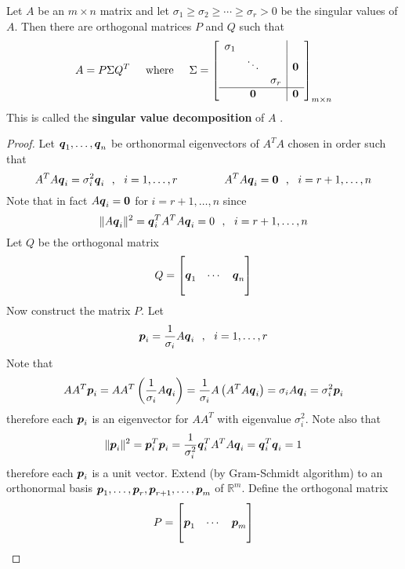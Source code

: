 \begin{theorem}
Let $A$ be an $m \times n$ matrix and let $\sigma_1 \geq \sigma_2 \geq \cdots \geq \sigma_r > 0$ be the singular values of $A$. Then there are orthogonal matrices $P$ and $Q$ such that
$$
A = P \Sigma Q^T
\hspace{5mm}
\text{where}
\hspace{5mm}
\Sigma =
\left[
\begin{array}{ccc|c}
\sigma_1 & & & \\
& \ddots & & \boldsymbol{0} \\
& & \sigma_r & \\ \hline
& \boldsymbol{0} & & \boldsymbol{0}
\end{array} \right]_{m \times n}
$$
This is called the {\bf singular value decomposition} of $A$ \cite[p.449]{KN}.

\begin{proof}
Let $\boldsymbol{q}_1,\dots,\boldsymbol{q}_n$ be orthonormal eigenvectors of $A^TA$ chosen in order such that
$$
A^TA \bs{q}_i = \sigma_i^2 \bs{q}_i \ \ , \ \ i =1,\dots,r
\hspace{15mm}
A^TA \bs{q}_i = \bs{0} \ \ , \ \ i =r+1,\dots,n
$$
Note that in fact $A\boldsymbol{q}_i = \boldsymbol{0}$ for $i=r+1,\dots,n$ since
$$
\| A\boldsymbol{q}_i \|^2 = \boldsymbol{q}_i^T A^T A\boldsymbol{q}_i = 0 \ \ , \ \ i=r+1,\dots,n
$$
Let $Q$ be the orthogonal matrix
$$
Q = \begin{bmatrix} & & \\ \boldsymbol{q}_1 & \cdots & \boldsymbol{q}_n \\ & & \end{bmatrix}
$$
Now construct the matrix $P$. Let
$$
\boldsymbol{p}_i = \frac{1}{\sigma_i} A \boldsymbol{q}_i \ \ , \ \ i = 1,\dots,r
$$
Note that
$$
AA^T \boldsymbol{p}_i =  AA^T \left( \frac{1}{\sigma_i} A \boldsymbol{q}_i \right)
= \frac{1}{\sigma_i} A \left( A^TA \boldsymbol{q}_i \right)
= \sigma_i A \boldsymbol{q}_i
= \sigma_i^2 \boldsymbol{p}_i
$$
therefore each $\boldsymbol{p}_i$ is an eigenvector for $AA^T$ with eigenvalue $\sigma_i^2$. Note also that
$$
\| \boldsymbol{p}_i \|^2 = \boldsymbol{p}_i^T \boldsymbol{p}_i
= \frac{1}{\sigma_i^2}  \boldsymbol{q}_i^T A^T A \boldsymbol{q}_i
= \boldsymbol{q}_i^T \boldsymbol{q}_i = 1
$$
therefore each $\boldsymbol{p}_i$ is a unit vector. Extend (by Gram-Schmidt algorithm) to an orthonormal basis $
\boldsymbol{p}_1,\dots,\boldsymbol{p}_r,\boldsymbol{p}_{r+1},\dots,\boldsymbol{p}_m$ of $\mathbb{R}^m$. Define the orthogonal matrix
$$
P = \begin{bmatrix} & & \\ \boldsymbol{p}_1 & \cdots & \boldsymbol{p}_m \\ & & \end{bmatrix}
$$
\end{proof}
\end{theorem}
